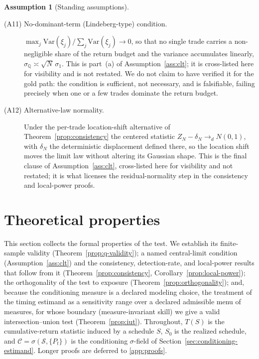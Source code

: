 \documentclass[preprint,12pt]{elsarticle}
\theoremstyle{definition}
\newtheorem{assumption}{Assumption}
\begin{document}
\begin{assumption}[Standing assumptions]
\begin{description}
\item[(A11) No-dominant-term (Lindeberg-type) condition.]
$\max_j\mathrm{Var}(\xi_j)/\allowbreak\sum_j\mathrm{Var}(\xi_j)\to0$, so that no single
trade carries a non-negligible share of the return budget and the variance
accumulates linearly, $\sigma_{\mathbb Q}\asymp\sqrt N\,\sigma_1$. This is
part~(a) of Assumption~\ref{ass:clt}; it is cross-listed here for visibility and
is not restated. We do not claim to have verified it for the gold path: the
condition is sufficient, not necessary, and is falsifiable, failing precisely
when one or a few trades dominate the return budget.

\item[(A12) Alternative-law normality.] Under the per-trade location-shift
alternative of Theorem~\ref{prop:consistency} the centered statistic
$Z_N-\delta_N\to_d N(0,1)$, with $\delta_N$ the deterministic displacement defined
there, so the location shift moves the limit law without altering its Gaussian
shape. This is the final clause of Assumption~\ref{ass:clt}, cross-listed here for
visibility and not restated; it is what licenses the residual-normality step in the
consistency and local-power proofs.
\end{description}
\end{assumption}

\section{Theoretical properties}
\label{sec:theory}

This section collects the formal properties of the test. We establish its
finite-sample validity (Theorem~\ref{prop:q-validity}); a named central-limit
condition (Assumption~\ref{ass:clt}) and the consistency, detection-rate, and
local-power results that follow from it (Theorem~\ref{prop:consistency},
Corollary~\ref{prop:local-power}); the orthogonality of the test to exposure
(Theorem~\ref{prop:orthogonality}); and, because the conditioning measure is a
declared modeling choice, the treatment of the timing estimand as a sensitivity
range over a declared admissible menu of measures, for whose boundary
(measure-invariant skill) we give a valid intersection--union test
(Theorem~\ref{prop:iut}). Throughout, $T(S)$ is the cumulative-return statistic
induced by a schedule $S$, $S_0$ is the realized schedule, and
$\mathcal C=\sigma(\mathcal S,\{P_t\})$ is the conditioning $\sigma$-field of
Section~\ref{sec:conditioning-estimand}. Longer proofs are deferred to
\ref{app:proofs}.
\end{document}
